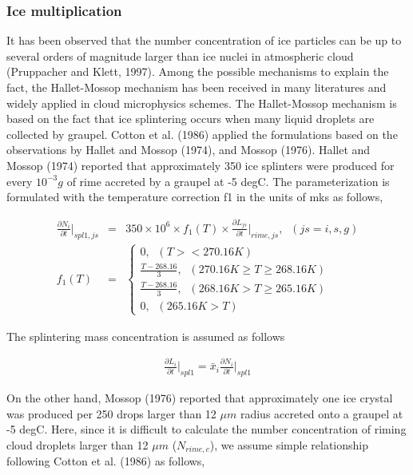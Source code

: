 \subsubsection{Ice multiplication}
It has been observed that the number concentration of ice particles can be up to several orders of magnitude larger than ice nuclei in atmospheric cloud (Pruppacher and Klett, 1997). Among the possible mechanisms to explain the fact, the Hallet-Mossop mechanism has been received in many literatures and widely applied in cloud microphysics schemes. The Hallet-Mossop mechanism is based on the fact that ice splintering occurs when many liquid droplets are collected by graupel. Cotton et al. (1986) applied the formulations based on the observations by Hallet and Mossop (1974), and Mossop (1976).
Hallet and Mossop (1974) reported that approximately 350 ice splinters were produced for every $10^{-3} g$ of rime accreted by a graupel at -5 degC. The parameterization is formulated with the temperature correction f1 in the units of mks as follows,

\begin{eqnarray}
\frac{\partial N_{i}}{\partial t}\Bigr|_{spl1,js}&=&350\times 10^{6}\times f_{1}(T)\times\frac{\partial L_{js}}{\partial t}\Bigr|_{rime,js},\;\;(js=i,s,g)\label{sn212}\\
f_{1}(T)&=&
\left\{
\begin{array}{l}
0,\;\;(T><270.16K) \\
\frac{T-268.16}{3},\;\;(270.16K \geq T \geq 268.16K) \\
\frac{T-268.16}{3},\;\;(268.16K > T \geq 265.16K) \\
0,\;\;(265.16K>T)
\label{sn213}
\end{array}
\right.
\end{eqnarray}

The splintering mass concentration is assumed as follows

\begin{eqnarray}
\frac{\partial L_{i}}{\partial t}\Bigr|_{spl1}=\bar{x}_{i}\frac{\partial N_{i}}{\partial t}\Bigr|_{spl1}\label{sn214}
\end{eqnarray}

On the other hand, Mossop (1976) reported that approximately one ice crystal was produced per 250 drops larger than 12 $\mu m$ radius accreted onto a graupel at -5 degC. Here, since it is difficult to calculate the number concentration of riming cloud droplets larger than 12 $\mu m$ ($N_{rime,c}$), we assume simple relationship following Cotton et al. (1986) as follows,

